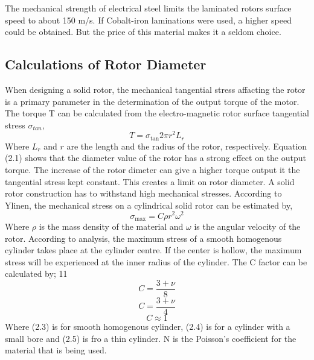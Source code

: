 The mechanical strength of electrical steel limits the laminated rotors surface
speed to about 150 m/s. If Cobalt-iron laminations were used, a higher speed could
be obtained. But the price of this material makes it a seldom choice.

\subsection{Calculations of Rotor Diameter} %

When designing a solid rotor, the mechanical tangential stress affacting the
rotor is a primary parameter in the determination of the output torque of the motor.
The torque T can be calculated from the electro-magnetic rotor surface tangential
stress $\sigma_{tan}$,
%
\begin{equation}\label{eq:2.1}
T = \sigma_{\text{tan}} 2\pi r^2 L_r
\end{equation}
%
Where $L_r$ and $r$ are the length and the radius of the rotor, respectively.
Equation (2.1) shows that the diameter value of the rotor has a strong effect on the
output torque. The increase of the rotor dimeter can give a higher torque output it the
tangential stress kept constant. This creates a limit on rotor diameter. A solid rotor
construction has to withstand high mechanical stresses. According to Ylinen, the
mechanical stress on a cylindrical solid rotor can be estimated by,
%
\begin{equation}\label{eq:2.2}
\sigma_{\max} = C \rho r^2 \omega^2
\end{equation}
%
Where $\rho$ is the mass density of the material and $\omega$ is the angular velocity of
the rotor. According to analysis, the maximum stress of a smooth homogenous
cylinder takes place at the cylinder centre. If the center is hollow, the maximum
stress will be experienced at the inner radius of the cylinder. The C factor can be
calculated by;
11
%
\begin{equation}\label{eq:2.3}
C = \frac{3+\nu}{8}
\end{equation}
%
%
\begin{equation}\label{eq:2.4}
C = \frac{3+\nu}{4}
\end{equation}
%
%
\begin{equation}\label{eq:2.5}
C \approx 1
\end{equation}
%
Where (2.3) is for smooth homogenous cylinder, (2.4) is for a cylinder with a small
bore and (2.5) is fro a thin cylinder. N is the Poisson's coefficient for the material
that is being used.

